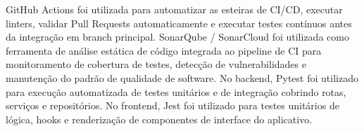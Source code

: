 GitHub Actions \cite{ages-iv-github-actions} foi utilizada para automatizar as esteiras de CI/CD, executar linters, validar Pull Requests automaticamente e executar testes contínuos antes da integração em branch principal. SonarQube / SonarCloud \cite{ages-iv-sonar} foi utilizada como ferramenta de análise estática de código integrada ao pipeline de CI para monitoramento de cobertura de testes, detecção de vulnerabilidades e manutenção do padrão de qualidade de software. No backend, Pytest \cite{ages-iv-pytest} foi utilizado para execução automatizada de testes unitários e de integração cobrindo rotas, serviços e repositórios. No frontend, Jest \cite{ages-iv-jest} foi utilizado para testes unitários de lógica, hooks e renderização de componentes de interface do aplicativo.\par

